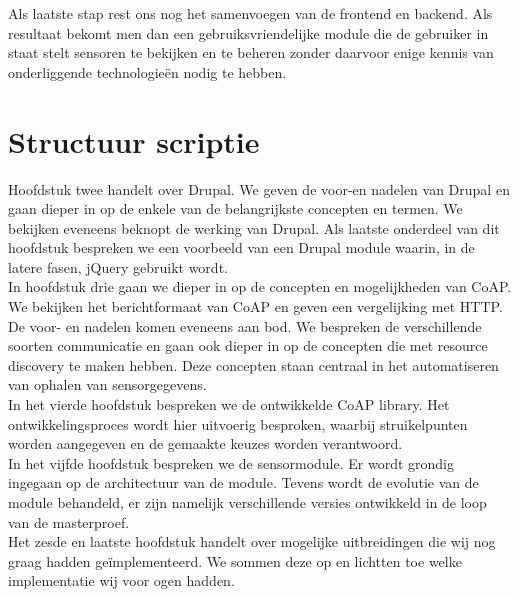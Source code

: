 Als laatste stap rest ons nog het samenvoegen van de frontend en backend. Als resultaat bekomt men dan een gebruiksvriendelijke module die de gebruiker in staat stelt sensoren te bekijken en te beheren zonder daarvoor enige kennis van onderliggende technologie\"{e}n nodig te hebben.


\section{Structuur scriptie}

Hoofdstuk twee handelt over Drupal. We geven de voor-en nadelen van Drupal en gaan dieper in op de enkele van de belangrijkste concepten en termen. We bekijken eveneens beknopt de werking van Drupal. Als laatste onderdeel van dit hoofdstuk bespreken we een voorbeeld van een Drupal module waarin, in de latere fasen, jQuery gebruikt wordt.\\

In hoofdstuk drie gaan we dieper in op de concepten en mogelijkheden van CoAP. We bekijken het berichtformaat van CoAP en geven een vergelijking met HTTP. De voor- en nadelen komen eveneens aan bod. We bespreken de verschillende soorten communicatie en gaan ook dieper in op de concepten die met resource discovery te maken hebben. Deze concepten staan centraal in het automatiseren van ophalen van sensorgegevens.\\

In het vierde hoofdstuk bespreken we de ontwikkelde CoAP library. Het ontwikkelingsproces wordt hier uitvoerig besproken, waarbij struikelpunten worden aangegeven en de gemaakte keuzes worden verantwoord.\\

In het vijfde hoofdstuk bespreken we de sensormodule. Er wordt grondig ingegaan op de architectuur van de module. Tevens wordt de evolutie van de module behandeld, er zijn namelijk verschillende versies ontwikkeld in de loop van de masterproef.\\

Het zesde en laatste hoofdstuk handelt over mogelijke uitbreidingen die wij nog graag hadden ge\"{i}mplementeerd. We sommen deze op en lichtten toe welke implementatie wij voor ogen hadden.










